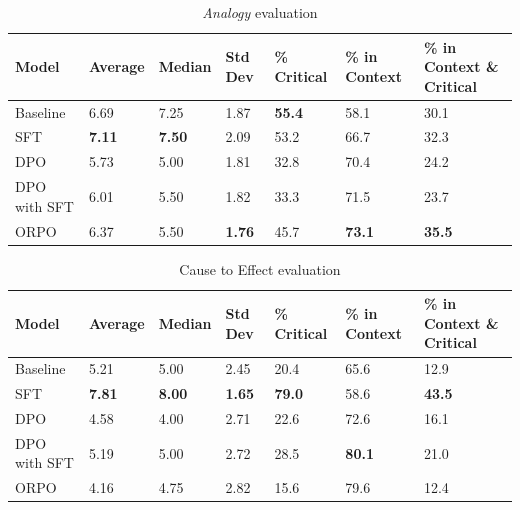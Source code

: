 \documentclass[11pt]{article}
\begin{document}
\begin{table}[H]
    \centering
    \begin{tabular}{lllllll}
        \hline
        \textbf{Model} & \textbf{Average} & \textbf{Median} & \textbf{Std Dev} & \textbf{\% Critical} &  \textbf{\% in Context} & \textbf{\% in Context \& Critical} \\
        \hline
        Baseline & 6.69 & 7.25 & 1.87 & \textbf{55.4} & 58.1 & 30.1 \\
        SFT & \textbf{7.11} & \textbf{7.50} & 2.09 & 53.2 & 66.7 & 32.3 \\
        DPO & 5.73 & 5.00 & 1.81 & 32.8 & 70.4 & 24.2 \\
        DPO with SFT & 6.01 & 5.50 & 1.82 & 33.3 & 71.5 & 23.7 \\
        ORPO & 6.37 & 5.50 & \textbf{1.76} & 45.7 & \textbf{73.1} & \textbf{35.5} \\
        \hline
    \end{tabular}
    \caption{\textit{Analogy} evaluation}
    \label{tab: analogy}
\end{table}

\begin{table}[H]
    \centering
    \begin{tabular}{lllllll}
        \hline
        \textbf{Model} & \textbf{Average} & \textbf{Median} & \textbf{Std Dev} & \textbf{\% Critical} &  \textbf{\% in Context} & \textbf{\% in Context \& Critical} \\
        \hline
        Baseline & 5.21 &	5.00 &	2.45 &	20.4 &	65.6 &	12.9\\
        SFT & \textbf{7.81} &	\textbf{8.00} &	\textbf{1.65} &	\textbf{79.0} &	58.6 &	\textbf{43.5} \\
        DPO & 4.58 &	4.00 & 2.71 &	22.6 &	72.6 &	16.1 \\
        DPO with SFT & 5.19 & 5.00 & 2.72 & 28.5 & \textbf{80.1} &	21.0 \\
        ORPO & 4.16 & 4.75 & 2.82 & 15.6 & 79.6 & 12.4 \\
        \hline
    \end{tabular}
    \caption{Cause to Effect evaluation}
    \label{tab: cause to effect}
\end{table}
\end{document}
